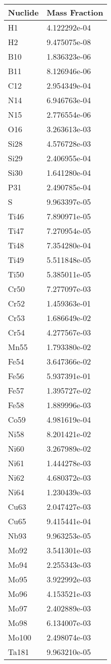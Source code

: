 \begin{centering}
\begin{longtable}[ht!]
{ p{} | p{} }
\hline
Nuclide & Mass Fraction\\
\hline
H1 & 4.122292e-04\\
H2 & 9.475075e-08\\
B10 & 1.836323e-06\\
B11 & 8.126946e-06\\
C12 & 2.954349e-04\\
N14 & 6.946763e-04\\
N15 & 2.776554e-06\\
O16 & 3.263613e-03\\
Si28 & 4.576728e-03\\
Si29 & 2.406955e-04\\
Si30 & 1.641280e-04\\
P31 & 2.490785e-04\\
S & 9.963397e-05\\
Ti46 & 7.890971e-05\\
Ti47 & 7.270954e-05\\
Ti48 & 7.354280e-04\\
Ti49 & 5.511848e-05\\
Ti50 & 5.385011e-05\\
Cr50 & 7.277097e-03\\
Cr52 & 1.459363e-01\\
Cr53 & 1.686649e-02\\
Cr54 & 4.277567e-03\\
Mn55 & 1.793380e-02\\
Fe54 & 3.647366e-02\\
Fe56 & 5.937391e-01\\
Fe57 & 1.395727e-02\\
Fe58 & 1.889996e-03\\
Co59 & 4.981619e-04\\
Ni58 & 8.201421e-02\\
Ni60 & 3.267989e-02\\
Ni61 & 1.444278e-03\\
Ni62 & 4.680372e-03\\
Ni64 & 1.230439e-03\\
Cu63 & 2.047427e-03\\
Cu65 & 9.415441e-04\\
Nb93 & 9.963253e-05\\
Mo92 & 3.541301e-03\\
Mo94 & 2.255343e-03\\
Mo95 & 3.922992e-03\\
Mo96 & 4.153521e-03\\
Mo97 & 2.402889e-03\\
Mo98 & 6.134007e-03\\
Mo100 & 2.498074e-03\\
Ta181 & 9.963210e-05\\


\end{longtable}
\end{centering}
